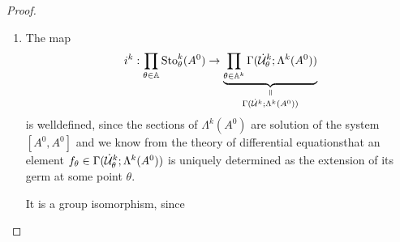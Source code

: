 \begin{proof}
  \begin{enumerate}
    \item The map
      \[
        i^k: \underset{\theta\in\A}\prod\Sto_\theta^k(A^0)
        \to
        \underset{\Gamma(\dot\cU^k;\Lambda^k(A^0))}{%
          \underset{\text{\rotatebox[origin=c]{-90}{$=$}}}{%
            \underbrace{%
              \prod_{\theta\in\A^k}\Gamma(\dot\cU_\theta^k;\Lambda^k(A^0))
            }
        }}
      \]
      is welldefined, since the sections of $\Lambda^k(A^0)$ are solution of
      the system $[A^0,A^0]$ and we know from the theory of differential
      equations\TODO[source?] that an element
      $f_\theta\in\Gamma(\dot{\mathcal{U}}_\theta^k;\Lambda^k(A^0))$ is uniquely
      determined as the extension of its germ at some point $\theta$.

      It is a group isomorphism, since
      \begin{comment}
        Problems:
        \begin{itemize}
          \item \PROBLEM[$\Sto_\theta^k(A^0)\subsetneq\Lambda_\theta^k(A^0)$]
            and thus
            \[
              i^k:
              \underset{\theta\in\A}\prod\Sto_\theta^k(A^0)
              \subsetneq
              \underset{\theta\in\A}\prod\Lambda_\theta^k(A^0)
              \to
              \prod_{\theta\in\A^k}\Gamma(\dot\cU_\theta^k;\Lambda^k(A^0))
            \]
        \end{itemize}
        IDEAS:
        \begin{itemize}
          \item Are sections fully determined by there germs at some points?
            \begin{itemize}
              \item since sections are defined by differential equations??


\end{comment}
\end{enumerate}
\end{proof}
